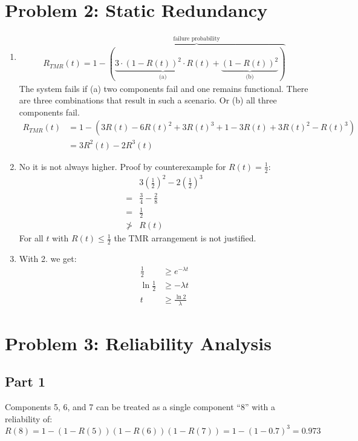 \documentclass[a4paper,parskip,headheight=38pt]{scrartcl} %
\begin{document}
\section*{Problem 2: Static Redundancy}
\begin{enumerate}
\item \begin{align*}
R_{TMR}(t) = 1 - \overbrace{\left( \underbrace{3 \cdot (1 - R(t))^2 \cdot R(t)}_{\text{(a)}} + \underbrace{(1 - R(t))^2}_{\text{(b)}} \right)}^{\text{failure probability}}
\end{align*}
The system fails if (a) two components fail and one remains functional. There are three combinations that result in such a scenario. Or (b) all three components fail.
\begin{align*}
R_{TMR}(t) &= 1 - (3R(t) - 6R(t)^2 + 3R(t)^3 + 1 - 3R(t) + 3R(t)^2 - R(t)^3) \\
&= 3 R^2(t) - 2 R^3(t)
\end{align*}
\item
No it is not always higher. Proof by counterexample for $R(t) = \frac{1}{2}$:
\begin{align*}
& 3\left(\frac{1}{2}\right)^2 - 2\left(\frac{1}{2}\right)^3 \\
=& \frac{3}{4} - \frac{2}{8} \\
=& \frac{1}{2} \\
\not >& R(t)
\end{align*}
For all $t$ with $R(t) \leq \frac{1}{2}$ the TMR arrangement is not justified.
\item With 2. we get:
\begin{align*}
\frac{1}{2} &\geq e^{-\lambda t} \\
\ln \frac{1}{2} &\geq -\lambda t \\
t &\geq \frac{\ln 2}{\lambda}
\end{align*}
\end{enumerate}


\section*{Problem 3: Reliability Analysis}

\subsection*{Part 1}

Components 5, 6, and 7 can be treated as a single component \enquote{8} with a reliability of:
\[R(8) = 1 - (1 - R(5))(1 - R(6))(1 - R(7)) = 1 - (1-0.7)^3 = 0.973\]
\end{document}
